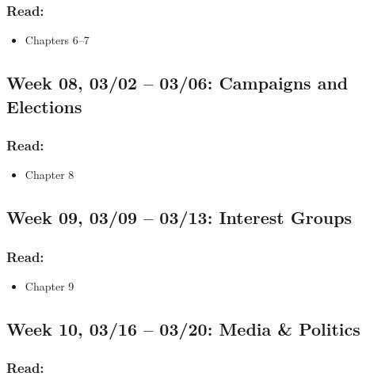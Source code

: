 \documentclass[11pt,]{article}
\providecommand{\tightlist}{%
  \setlength{\itemsep}{0pt}\setlength{\parskip}{0pt}}
\begin{document}
\hypertarget{read-6}{%
\subsubsection{Read:}\label{read-6}}

\begin{itemize}
\tightlist
\item
  Chapters 6--7
\end{itemize}

\hypertarget{week-08-0302-0306-campaigns-and-elections}{%
\subsection{Week 08, 03/02 -- 03/06: Campaigns and
Elections}\label{week-08-0302-0306-campaigns-and-elections}}

\hypertarget{read-7}{%
\subsubsection{Read:}\label{read-7}}

\begin{itemize}
\tightlist
\item
  Chapter 8
\end{itemize}

\hypertarget{week-09-0309-0313-interest-groups}{%
\subsection{Week 09, 03/09 -- 03/13: Interest
Groups}\label{week-09-0309-0313-interest-groups}}

\hypertarget{read-8}{%
\subsubsection{Read:}\label{read-8}}

\begin{itemize}
\tightlist
\item
  Chapter 9
\end{itemize}

\hypertarget{week-10-0316-0320-media-politics}{%
\subsection{Week 10, 03/16 -- 03/20: Media \&
Politics}\label{week-10-0316-0320-media-politics}}

\hypertarget{read-9}{%
\subsubsection{Read:}\label{read-9}}
\end{document}
